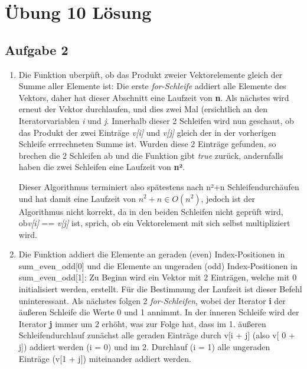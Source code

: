 \documentclass{article}
\begin{document}
\section*{Übung 10 Lösung}

    \subsection*{Aufgabe 2}

    \begin{enumerate}[label=(\alph*)]

        \item Die Funktion uberpüft, ob das Produkt zweier Vektorelemente gleich der Summe aller Elemente ist:
		\newline\newline
		Die erste \textit{for-Schleife} addiert alle Elemente des Vektors, daher hat dieser Abschnitt eine Laufzeit von \textbf{n}.
		Als nächstes wird erneut  der Vektor durchlaufen, und dies zwei Mal (ersichtlich an den Iteratorvariablen \textit{i} und \textit{j}.
		Innerhalb dieser 2 Schleifen wird nun geschaut, ob das Produkt der zwei Einträge \textit{v[i]} und \textit{v[j]} gleich der in der vorherigen Schleife errrechneten
		Summe ist. Wurden diese 2 Einträge gefunden, so brechen die 2 Schleifen ab und die Funktion gibt \textit{true} zurück, andernfalls haben die zwei Schleifen
		eine Laufzeit von \textbf{n²}.

		Dieser Algorithmus terminiert also spätestens nach n²+n Schleifendurchäufen und hat damit eine Laufzeit von $n^{2}+n \in O(n^{2})$, jedoch 
		ist der Algorithmus nicht
		korrekt, da in den beiden Schleifen nicht geprüft wird, ob\newline \textit{v[i]} == \textit{v[j]}
		ist, sprich, ob ein Vektorelement mit sich selbst multipliziert wird.
	
		\item  Die Funktion addiert die Elemente an geraden (even) Index-Positionen in sum\_even\_odd[0] und
		die Elemente an ungeraden (odd) Index-Positionen in sum\_even\_odd[1]:
		\newline\newline
		Zu Beginn wird ein Vektor mit 2 Einträgen, welche mit 0 initialisiert werden, erstellt. Für die Bestimmung der Laufzeit ist dieser Befehl uninteressant.
		Als nächstes folgen 2 \textit{for-Schleifen}, wobei der Iterator \textbf{i} der äußeren Schleife die Werte 0 und 1 annimmt. In der inneren Schleife wird der Iterator \textbf{j}
		immer um 2 erhöht, was zur Folge hat, dass im 1. äußeren Schleifendurchlauf zunächst alle geraden Einträge durch v[i + j] (also v[ 0 + j]) addiert werden (i = 0) und im 2. 
		Durchlauf (i = 1) alle ungeraden Einträge (v[1 + j]) miteinander addiert werden.


\end{enumerate}
\end{document}
